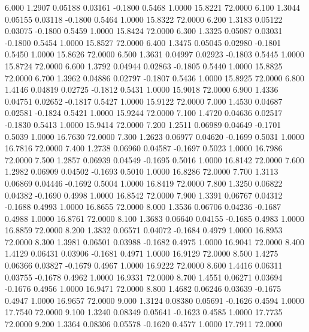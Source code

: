    6.000   1.2907   0.05188   0.03161  -0.1800   0.5468   1.0000  15.8221  72.0000
   6.100   1.3044   0.05155   0.03118  -0.1800   0.5464   1.0000  15.8322  72.0000
   6.200   1.3183   0.05122   0.03075  -0.1800   0.5459   1.0000  15.8424  72.0000
   6.300   1.3325   0.05087   0.03031  -0.1800   0.5454   1.0000  15.8527  72.0000
   6.400   1.3475   0.05045   0.02980  -0.1801   0.5450   1.0000  15.8626  72.0000
   6.500   1.3631   0.04997   0.02923  -0.1803   0.5445   1.0000  15.8724  72.0000
   6.600   1.3792   0.04944   0.02863  -0.1805   0.5440   1.0000  15.8825  72.0000
   6.700   1.3962   0.04886   0.02797  -0.1807   0.5436   1.0000  15.8925  72.0000
   6.800   1.4146   0.04819   0.02725  -0.1812   0.5431   1.0000  15.9018  72.0000
   6.900   1.4336   0.04751   0.02652  -0.1817   0.5427   1.0000  15.9122  72.0000
   7.000   1.4530   0.04687   0.02581  -0.1824   0.5421   1.0000  15.9244  72.0000
   7.100   1.4720   0.04636   0.02517  -0.1830   0.5413   1.0000  15.9414  72.0000
   7.200   1.2511   0.06989   0.04649  -0.1701   0.5039   1.0000  16.7630  72.0000
   7.300   1.2623   0.06977   0.04620  -0.1699   0.5031   1.0000  16.7816  72.0000
   7.400   1.2738   0.06960   0.04587  -0.1697   0.5023   1.0000  16.7986  72.0000
   7.500   1.2857   0.06939   0.04549  -0.1695   0.5016   1.0000  16.8142  72.0000
   7.600   1.2982   0.06909   0.04502  -0.1693   0.5010   1.0000  16.8286  72.0000
   7.700   1.3113   0.06869   0.04446  -0.1692   0.5004   1.0000  16.8419  72.0000
   7.800   1.3250   0.06822   0.04382  -0.1690   0.4998   1.0000  16.8542  72.0000
   7.900   1.3391   0.06767   0.04312  -0.1688   0.4993   1.0000  16.8655  72.0000
   8.000   1.3536   0.06706   0.04236  -0.1687   0.4988   1.0000  16.8761  72.0000
   8.100   1.3683   0.06640   0.04155  -0.1685   0.4983   1.0000  16.8859  72.0000
   8.200   1.3832   0.06571   0.04072  -0.1684   0.4979   1.0000  16.8953  72.0000
   8.300   1.3981   0.06501   0.03988  -0.1682   0.4975   1.0000  16.9041  72.0000
   8.400   1.4129   0.06431   0.03906  -0.1681   0.4971   1.0000  16.9129  72.0000
   8.500   1.4275   0.06366   0.03827  -0.1679   0.4967   1.0000  16.9222  72.0000
   8.600   1.4416   0.06311   0.03755  -0.1678   0.4962   1.0000  16.9331  72.0000
   8.700   1.4551   0.06271   0.03694  -0.1676   0.4956   1.0000  16.9471  72.0000
   8.800   1.4682   0.06246   0.03639  -0.1675   0.4947   1.0000  16.9657  72.0000
   9.000   1.3124   0.08380   0.05691  -0.1626   0.4594   1.0000  17.7540  72.0000
   9.100   1.3240   0.08349   0.05641  -0.1623   0.4585   1.0000  17.7735  72.0000
   9.200   1.3364   0.08306   0.05578  -0.1620   0.4577   1.0000  17.7911  72.0000
